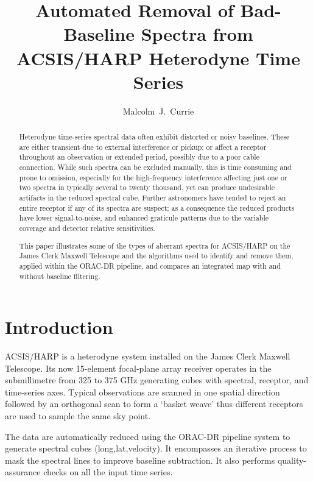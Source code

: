 
\resetcounters



\title{Automated Removal of Bad-Baseline Spectra from ACSIS/HARP
Heterodyne Time Series}
\author{Malcolm~J.~Currie
}


\begin{abstract}
Heterodyne time-series spectral data often exhibit distorted or noisy baselines. These are either transient due to external interference or pickup; or affect a receptor throughout an observation or extended period, possibly due to a poor cable connection. While such spectra can be excluded manually, this is time consuming and prone to omission, especially for the high-frequency interference affecting just one or two spectra in typically several to twenty thousand, yet can produce undesirable artifacts in the reduced spectral cube. Further astronomers have tended to reject an entire receptor if any of its spectra are suspect; as a consequence the reduced products have lower signal-to-noise, and enhanced graticule patterns due to the variable coverage and detector relative sensitivities.

This paper illustrates some of the types of aberrant spectra for ACSIS/HARP on the James Clerk Maxwell Telescope and the algorithms used to identify and remove them, applied within the ORAC-DR pipeline, and compares an integrated map with and without baseline filtering. 
\end{abstract}

\section{Introduction}

ACSIS/HARP \citep{buckle_2009} is a heterodyne system installed on the James Clerk Maxwell Telescope. Its now 15-element focal-plane array receiver operates in the submillimetre from 325 to 375 GHz generating cubes with spectral, receptor, and time-series axes. Typical observations are scanned in one spatial direction followed by an orthogonal scan to form a `basket weave' thus different receptors are used to sample the same sky point.

The data are automatically reduced using the ORAC-DR pipeline system \citep{cavanagh_2008,jenness_2008} to generate spectral cubes (long,lat,velocity). It encompasses an iterative process to mask the spectral lines to improve baseline subtraction.  It also performs quality-assurance checks on all the input time series.

